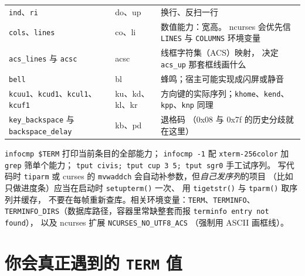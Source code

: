 \documentclass[12pt,a4paper,fontset=fandol]{ctexbook}
\newcommand{\Fn}[1]{\texttt{#1()}}
\newcommand{\Tp}[1]{\texttt{#1}}
\newcommand{\Bk}{\allowbreak}
\begin{document}
\begin{longtable}{@{}>{\raggedright\arraybackslash}p{}
                 >{\raggedright\arraybackslash}p{}
                 >{\raggedright\arraybackslash}p{}@{}}
\Tp{ind}、\Tp{ri} & do、up & 换行、反扫一行 \\
\Tp{cols}、\Tp{lines} & co、li & 数值能力：宽高。
ncurses 会优先信 \Tp{LINES} 与 \Tp{COLUMNS} 环境变量 \\
\Tp{acs\_lines} 与 \Tp{acsc} & acsc & 线框字符集（ACS）映射，
决定 \lstinline|acs_up| 那套框线画什么 \\
\Tp{bell} & bl & 蜂鸣；宿主可能实现成闪屏或静音 \\
\Tp{kcuu1}、\Tp{kcud1}、\Tp{kcul1}、\Tp{kcuf1} & ku、kd、kl、kr &
方向键的实际序列；\Tp{khome}、\Tp{kend}、\Tp{kpp}、\Tp{knp} 同理 \\
\Tp{key\Bk\_backspace} 与 \Tp{backspace\Bk\_delay} & kb、pd & 退格码
（0x08 与 0x7f 的历史分歧就在这里） \\
\bottomrule
\end{longtable}

\begin{note}[title={读 terminfo 的三条实用命令}]
\lstinline{infocmp $TERM} 打印当前条目的全部能力；
\lstinline{infocmp -1} 配 \Tp{xterm\Bk-256color} 加
\lstinline{grep} 筛单个能力；
\lstinline{tput civis; tput cup 3 5; tput sgr0} 手工试序列。
写代码时 \lstinline{tiparm} 或 curses 的
\lstinline{mvwaddch} 会自动补参数，但\emph{自己发序列}的项目
（比如只做进度条）应当在启动时 \Fn{setupterm} 一次、
用 \Fn{tigetstr} 与 \Fn{tparm} 取序列并缓存，
不要在每帧重新查库。相关环境变量：\Tp{TERM}、\Tp{TERMINFO}、
\Tp{TERMINFO\_DIRS}（数据库路径，容器里常缺整套而报
\lstinline{terminfo entry not found}），
以及 ncurses 扩展 \Tp{NCURSES\_NO\_UTF8\_ACS}
（强制用 ASCII 画框线）。
\end{note}

\section{你会真正遇到的 \Tp{TERM} 值}
\end{document}
